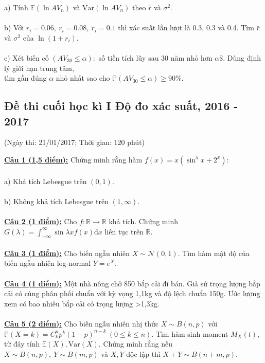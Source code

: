 \documentclass[10pt, a4paper]{article}
\begin{document}
\color{red}a) \color{black}Tính $\mathbb E(\ln AV_n)$ và $\text{Var}(\ln AV_n)$ theo $\bar r$ và $\sigma^2$.\\\\
\color{red}b) \color{black}Với $r_i=0.06,~r_i=0.08,~r_i=0.1$ thì xác suất lần lượt là 0.3, 0.3 và 0.4. Tìm $\bar r$ và $\sigma^2$ của $\ln(1+r_i)$.\\\\
\color{red}c) \color{black}Xét biến cố $(AV_{30}\le\alpha):$ số tiền tích lũy sau 30 năm nhỏ hơn $\alpha\$$. Dùng định lý giới hạn trung tâm,\\ tìm gần đúng $\alpha$ nhỏ nhất sao cho $\mathbb P(AV_{30}\le\alpha)\ge90\%$.

\newpage

\subsection{Đề thi cuối học kì I Độ đo xác suất, 2016 - 2017}
\begin{center}
	\color{blue}(Ngày thi: 21/01/2017; Thời gian: 120 phút)
\end{center}
\color{red}\underline{\textbf{Câu 1 (1,5 điểm):}} \color{black}Chứng minh rằng hàm $f(x)=x\left(\sin^5x+2^x\right)$:\\\\
\color{red}a) \color{black}Khả tích Lebesgue trên $(0,1)$.\\\\
\color{red}b) \color{black}Không khả tích Lebesgue trên $(1,\infty)$.\\\\
\color{red}\underline{\textbf{Câu 2 (1 điểm):}} \color{black}Cho $f:\mathbb R\rightarrow\mathbb R$ khả tích. Chứng minh $G(\lambda)=\displaystyle\int_{-\infty}^\infty\sin\lambda xf(x)\text{d}x$ liên tục trên $\mathbb R$.\\\\
\color{red}\underline{\textbf{Câu 3 (1 điểm):}} \color{black}Cho biến ngẫu nhiên $X\sim\mathcal N(0,1)$. Tìm hàm mật độ của biến ngẫu nhiên log-normal $Y=e^X$.\\\\
\color{red}\underline{\textbf{Câu 4 (1 điểm):}} \color{black}Một nhà nông chở 850 bắp cải đi bán. Giả sử trọng lượng bắp cải có cùng phân phối chuẩn với kỳ vọng 1,1kg và độ lệch chuẩn 150g. Ước lượng xem có bao nhiêu bắp cải có trọng lượng >1,3kg.\\\\
\color{red}\underline{\textbf{Câu 5 (2 điểm):}} \color{black}Cho biến ngẫu nhiên nhị thức $X\sim B(n,p)$ với $\mathbb P(X=k)=C_k^np^k(1-p)^{n-k}~(0\le k\le n)$. Tìm hàm sinh moment $M_X(t)$, từ đây tính $\mathbb E(X),\text{Var}(X)$. Chứng minh rằng nếu $X\sim B(n,p),~Y\sim B(m,p)$ và $X,Y$ độc lập thì $X+Y\sim B(n+m,p)$.\\\\
\end{document}
